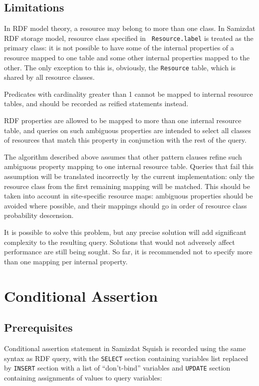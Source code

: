 \documentclass{llncs}
\begin{document}
\subsection{Limitations}

In RDF model theory\cite{rdf-mt}, a resource may belong to more than one
class. In Samizdat RDF storage model, resource class specified in {\tt
Resource.label} is treated as the primary class: it is not possible to have
some of the internal properties of a resource mapped to one table and some
other internal properties mapped to the other. The only exception to this is,
obviously, the {\tt Resource} table, which is shared by all resource classes.

Predicates with cardinality greater than 1 cannot be mapped to internal
resource tables, and should be recorded as reified statements instead.

RDF properties are allowed to be mapped to more than one internal resource
table, and queries on such ambiguous properties are intended to select all
classes of resources that match this property in conjunction with the rest of
the query.

The algorithm described above assumes that other pattern clauses refine such
ambiguous property mapping to one internal resource table. Queries that fail
this assumption will be translated incorrectly by the current implementation:
only the resource class from the first remaining mapping will be matched. This
should be taken into account in site-specific resource maps: ambiguous
properties should be avoided where possible, and their mappings should go in
order of resource class probability descension.

It is possible to solve this problem, but any precise solution will add
significant complexity to the resulting query. Solutions that would not
adversely affect performance are still being sought. So far, it is recommended
not to specify more than one mapping per internal property.


\section{Conditional Assertion}
%
\subsection{Prerequisites}

Conditional assertion statement in Samizdat Squish is recorded using the same
syntax as RDF query, with the {\tt SELECT} section containing variables list
replaced by {\tt INSERT} section with a list of ``don't-bind'' variables and
{\tt UPDATE} section containing assignments of values to query variables:
\end{document}
